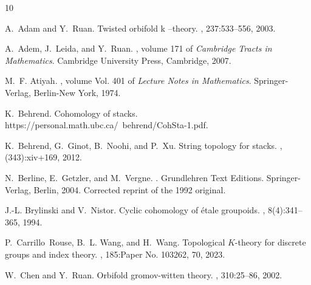 \documentclass[a4paper]{amsart}
\newcommand\<{\langle}
\renewcommand\>{\rangle}
\theoremstyle{definition}
\theoremstyle{remark}
\begin{document}
%
%


\begin{thebibliography}{10}

A.~Adam and Y.~Ruan.
\newblock Twisted orbifold k –theory.
, 237:533--556, 2003.

A.~Adem, J.~Leida, and Y.~Ruan.
, volume 171 of {\em Cambridge
  Tracts in Mathematics}.
\newblock Cambridge University Press, Cambridge, 2007.

M.~F. Atiyah.
, volume Vol. 401 of {\em
  Lecture Notes in Mathematics}.
\newblock Springer-Verlag, Berlin-New York, 1974.

K.~Behrend.
\newblock Cohomology of stacks.
\newblock https://personal.math.ubc.ca/~behrend/CohSta-1.pdf.

K.~Behrend, G.~Ginot, B.~Noohi, and P.~Xu.
\newblock String topology for stacks.
, (343):xiv+169, 2012.

N.~Berline, E.~Getzler, and M.~Vergne.
.
\newblock Grundlehren Text Editions. Springer-Verlag, Berlin, 2004.
\newblock Corrected reprint of the 1992 original.

J.-L. Brylinski and V.~Nistor.
\newblock Cyclic cohomology of \'etale groupoids.
, 8(4):341--365, 1994.

P.~Carrillo~Rouse, B.~L. Wang, and H.~Wang.
\newblock Topological {$K$}-theory for discrete groups and index theory.
, 185:Paper No. 103262, 70, 2023.

W.~Chen and Y.~Ruan.
\newblock Orbifold gromov-witten theory.
, 310:25--86, 2002.


\end{thebibliography}
\end{document}
